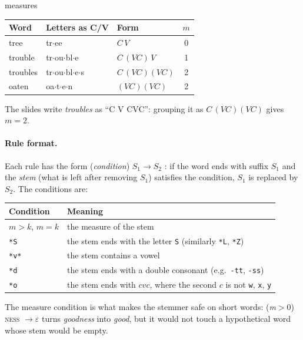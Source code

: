 \begin{nbexample}{measures}
\begin{center}
\small
\begin{tabular}{@{}l l l c@{}}
\toprule
\textbf{Word} & \textbf{Letters as C/V} & \textbf{Form} & $m$ \\
\midrule
tree     & tr$\cdot$ee                        & $C\,V$                & 0 \\
trouble  & tr$\cdot$ou$\cdot$bl$\cdot$e       & $C\,(VC)\,V$          & 1 \\
troubles & tr$\cdot$ou$\cdot$bl$\cdot$e$\cdot$s & $C\,(VC)(VC)$       & 2 \\
oaten    & oa$\cdot$t$\cdot$e$\cdot$n         & $(VC)(VC)$            & 2 \\
\bottomrule
\end{tabular}
\end{center}
The slides write \emph{troubles} as ``C V CVC'': grouping it as $C\,(VC)(VC)$ gives
$m = 2$.
\end{nbexample}

\paragraph{Rule format.} Each rule has the form \quad(\emph{condition})\; $S_1 \to S_2$
\quad: if the word ends with suffix $S_1$ and the \emph{stem} (what is left after
removing $S_1$) satisfies the condition, $S_1$ is replaced by $S_2$. The conditions are:

\begin{center}
\small
\begin{tabular}{@{}l l@{}}
\toprule
\textbf{Condition} & \textbf{Meaning} \\
\midrule
$m > k$, $m = k$ & the measure of the stem \\
\texttt{*S}  & the stem ends with the letter \texttt{S} (similarly \texttt{*L}, \texttt{*Z}) \\
\texttt{*v*} & the stem contains a vowel \\
\texttt{*d}  & the stem ends with a double consonant (e.g.\ \texttt{-tt}, \texttt{-ss}) \\
\texttt{*o}  & the stem ends with $cvc$, where the second $c$ is not \texttt{w}, \texttt{x}, \texttt{y} \\
\bottomrule
\end{tabular}
\end{center}

The measure condition is what makes the stemmer safe on short words: (\emph{m}$>$0)
\textsc{ness} $\to \varepsilon$ turns \emph{goodness} into \emph{good}, but it would not
touch a hypothetical word whose stem would be empty.

